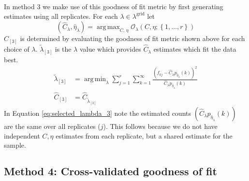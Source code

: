 \documentclass[oupdraft]{bio}
\DeclareMathOperator*{\argmin}{arg\,min}
\DeclareMathOperator*{\argmax}{arg\,max}
\newcommand{\lambdagrid}{\lambda^{\text{grid}}}
\begin{document}
In method 3 we make use of this goodness of fit metric by first generating estimates using all replicates.  For each $\lambda \in \lambdagrid$ let
\begin{equation}
\left(\widehat{C}_{\lambda}, \widehat{\eta}_{\lambda} \right) = \argmax_{C, \, \eta} \mathcal{O}_\lambda \left(C, \eta; \left\{1, \dots, r \right\} \right) \label{eq:c_hat_lambdas_method_3}
\end{equation}
$\widehat{C}_{[3]}$ is determined by evaluating the goodness of fit metric shown above for each choice of $\lambda$.  $\widetilde{\lambda}_{[3]}$ is the $\lambda$ value which provides $\widehat{C}_{\lambda}$ estimates which fit the data best.
\begin{align}
\widetilde{\lambda}_{[3]} &= \argmin_{\lambda} \sum_{j=1}^r \sum_{k=1}^{\infty} \frac{ \left( f_{kj} - \widehat{C}_{\lambda} p_{\widehat{\eta}_{\lambda}}(k) \right)^2}{\widehat{C}_{\lambda}p_{\widehat{\eta}_{\lambda}}(k)} \label{eq:selected_lambda_3} \\
\widehat{C}_{[3]} &= \widehat{C}_{\widetilde{\lambda}_{[3]}}
\end{align}
In Equation \eqref{eq:selected_lambda_3} note the estimated counts $\left( \widehat{C}_{\lambda} p_{\widehat{\eta}_{\lambda}}(k) \right)$ are the same over all replicates ($j$).  This follows because we do not have independent $C, \eta$ estimates from each replicate, but a shared estimate for the sample.

%
%
%
\subsection{Method 4: Cross-validated goodness of fit}
\end{document}
